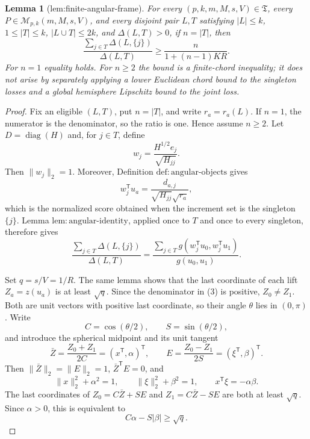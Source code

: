 \documentclass{article}
\newtheorem{lemma}{Lemma}
\begin{document}
\begin{lemma}[lem:finite-angular-frame]\label{lem:finite-angular-frame}
For every \((p,k,m,M,s,V)\in\mathfrak T\), every \(P\in\mathcal M_{p,k}(m,M,s,V)\), and every disjoint pair \(L,T\) satisfying \(|L|\le k\), \(1\le |T|\le k\), \(|L\cup T|\le2k\), and \(\Delta(L,T)>0\), if \(n=|T|\), then
\[
 \frac{\sum_{j\in T}\Delta(L,\{j\})}{\Delta(L,T)}
 \ge \frac{n}{1+(n-1)KR}.
\]
For \(n=1\) equality holds.  For \(n\ge2\) the bound is a finite-chord inequality; it does not arise by separately applying a lower Euclidean chord bound to the singleton losses and a global hemisphere Lipschitz bound to the joint loss.
\end{lemma}
\begin{proof}
Fix an eligible \((L,T)\), put \(n=|T|\), and write \(r_a=r_a(L)\).  If \(n=1\), the numerator is the denominator, so the ratio is one.  Hence assume \(n\ge2\).  Let \(D=\operatorname{diag}(H)\) and, for \(j\in T\), define
\[
 w_j=\frac{H^{1/2}e_j}{\sqrt{H_{jj}}}.
\]
Then \(\|w_j\|_2=1\).  Moreover, Definition \(\mathrm{def{:}angular\text{-}objects}\) gives
\[
 w_j^{\mathsf T}u_a
 =\frac{d_{a,j}}{\sqrt{H_{jj}}\sqrt{r_a}}, \tag{2}
\]
which is the normalized score obtained when the increment set is the singleton \(\{j\}\).  Lemma \(\mathrm{lem{:}angular\text{-}identity}\), applied once to \(T\) and once to every singleton, therefore gives
\[
 \frac{\sum_{j\in T}\Delta(L,\{j\})}{\Delta(L,T)}
 =\frac{\sum_{j\in T}g(w_j^{\mathsf T}u_0,w_j^{\mathsf T}u_1)}{g(u_0,u_1)}. \tag{3}
\]

Set \(q=s/V=1/R\).  The same lemma shows that the last coordinate of each lift \(Z_a=z(u_a)\) is at least \(\sqrt q\).  Since the denominator in (3) is positive, \(Z_0\ne Z_1\).  Both are unit vectors with positive last coordinate, so their angle \(\theta\) lies in \((0,\pi)\).  Write
\[
 C=\cos(\theta/2),\qquad S=\sin(\theta/2),
\]
and introduce the spherical midpoint and its unit tangent
\[
 \bar Z=\frac{Z_0+Z_1}{2C}=(x^{\mathsf T},\alpha)^{\mathsf T},
 \qquad
 E=\frac{Z_0-Z_1}{2S}=(\xi^{\mathsf T},\beta)^{\mathsf T}.
\]
Then \(\|\bar Z\|_2=\|E\|_2=1\), \(\bar Z^{\mathsf T}E=0\), and
\[
 \|x\|_2^2+\alpha^2=1,\qquad
 \|\xi\|_2^2+\beta^2=1,\qquad
 x^{\mathsf T}\xi=-\alpha\beta. \tag{4}
\]
The last coordinates of \(Z_0=C\bar Z+SE\) and \(Z_1=C\bar Z-SE\) are both at least \(\sqrt q\).  Since \(\alpha>0\), this is equivalent to
\[
 C\alpha-S|\beta|\ge\sqrt q. \tag{5}
\]


\end{proof}
\end{document}
